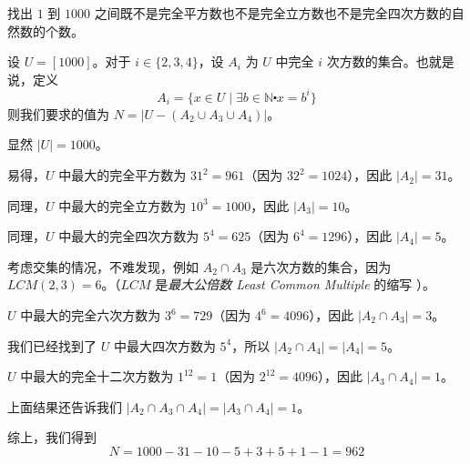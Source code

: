 \begin{example}
    找出 $1$ 到 $1000$ 之间既不是完全平方数也不是完全立方数也不是完全四次方数的自然数的个数。

    设 $U=[1000]$。对于 $i \in \{2,3,4\}$，设 $A_i$ 为 $U$ 中完全 $i$ 次方数的集合。也就是说，定义
    \[A_i = \{x \in U \mid \exists b \in \mathbb{N} \centerdot x = b^i\}\]
    则我们要求的值为 $N = |U - (A_2 \cup A_3 \cup A_4)|$。

    显然 $|U| = 1000$。

    易得，$U$ 中最大的完全平方数为 $31^2=961$（因为 $32^2 = 1024$），因此 $|A_2| = 31$。

    同理，$U$ 中最大的完全立方数为 $10^3=1000$，因此 $|A_3|=10$。

    同理，$U$ 中最大的完全四次方数为 $5^4=625$（因为 $6^4=1296$），因此 $|A_4|=5$。

    考虑交集的情况，不难发现，例如 $A_2 \cap A_3$ 是六次方数的集合，因为 $LCM(2,3)=6$。（$LCM$ 是\emph{最大公倍数 Least Common Multiple} 的缩写 ）。

    $U$ 中最大的完全六次方数为 $3^6 = 729$（因为 $4^6=4096$），因此 $|A_2 \cap A_3|=3$。

    我们已经找到了 $U$ 中最大四次方数为 $5^4$，所以 $|A_2 \cap A_4|=|A_4|=5$。

    $U$ 中最大的完全十二次方数为 $1^{12} = 1$（因为 $2^{12}=4096$），因此 $|A_3 \cap A_4|=1$。

    上面结果还告诉我们 $|A_2 \cap A_3 \cap A_4| = |A_3 \cap A_4|=1$。

    综上，我们得到
    \[N = 1000 - 31 - 10 - 5 + 3 + 5 + 1 - 1 = 962\]
\end{example}